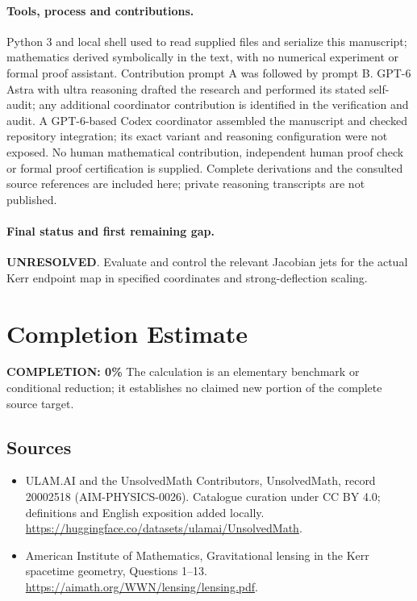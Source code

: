 \documentclass[11pt]{article}
\begin{document}
\paragraph{Tools, process and contributions.}
Python 3 and local shell used to read supplied files and serialize this manuscript; mathematics derived symbolically in the text, with no numerical experiment or formal proof assistant. Contribution prompt A was followed by prompt B. GPT-6 Astra with ultra reasoning drafted the research and performed its stated self-audit; any additional coordinator contribution is identified in the verification and audit. A GPT-6-based Codex coordinator assembled the manuscript and checked repository integration; its exact variant and reasoning configuration were not exposed. No human mathematical contribution, independent human proof check or formal proof certification is supplied. Complete derivations and the consulted source references are included here; private reasoning transcripts are not published.

\paragraph{Final status and first remaining gap.}
\textbf{UNRESOLVED}. Evaluate and control the relevant Jacobian jets for the actual Kerr endpoint map in specified coordinates and strong-deflection scaling.

\section{Completion Estimate}
\noindent\textbf{COMPLETION: 0\%}
The calculation is an elementary benchmark or conditional reduction; it establishes no claimed new portion of the complete source target.

\subsection{Sources}
\begin{itemize}
\item[\hypertarget{source:20002518:1}{S1}] ULAM.AI and the UnsolvedMath Contributors, UnsolvedMath, record 20002518 (AIM-PHYSICS-0026). Catalogue curation under CC BY 4.0; definitions and English exposition added locally.
\url{https://huggingface.co/datasets/ulamai/UnsolvedMath}.
\item[\hypertarget{source:20002518:2}{S2}] American Institute of Mathematics, Gravitational lensing in the Kerr spacetime geometry, Questions 1–13.
\url{https://aimath.org/WWN/lensing/lensing.pdf}.
\end{itemize}
\label{end:20002518}
\end{document}
